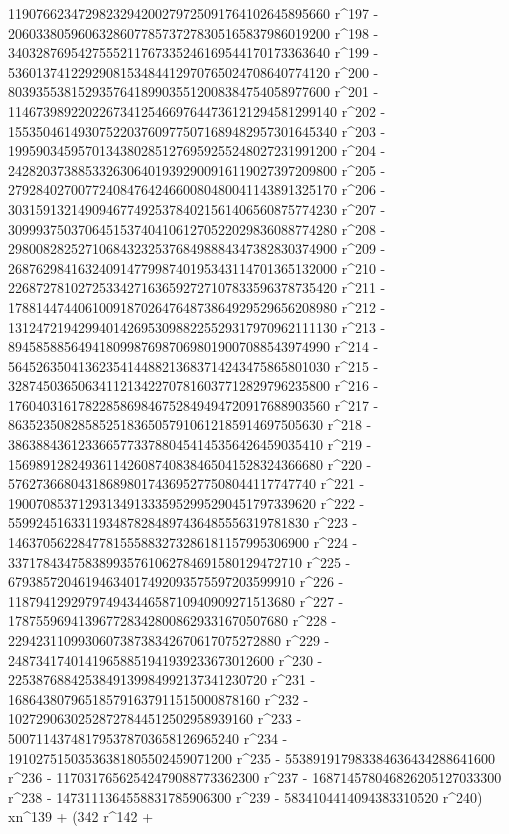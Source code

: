        1190766234729823294200279725091764102645895660 r^197 - 
       2060338059606328607785737278305165837986019200 r^198 - 
       3403287695427555211767335246169544170173363640 r^199 - 
       5360137412292908153484412970765024708640774120 r^200 - 
       8039355381529357641899035512008384754058977600 r^201 - 
       11467398922022673412546697644736121294581299140 r^202 - 
       15535046149307522037609775071689482957301645340 r^203 - 
       19959034595701343802851276959255248027231991200 r^204 - 
       24282037388533263064019392900916119027397209800 r^205 - 
       27928402700772408476424660080480041143891325170 r^206 - 
       30315913214909467749253784021561406560875774230 r^207 - 
       30999375037064515374041061270522029836088774280 r^208 - 
       29800828252710684323253768498884347382830374900 r^209 - 
       26876298416324091477998740195343114701365132000 r^210 - 
       22687278102725334271636592727107833596378735420 r^211 - 
       17881447440610091870264764873864929529656208980 r^212 - 
       13124721942994014269530988225529317970962111130 r^213 - 
       8945858856494180998769870698019007088543974990 r^214 - 
       5645263504136235414488213683714243475865801030 r^215 - 
       3287450365063411213422707816037712829796235800 r^216 - 
       1760403161782285869846752849494720917688903560 r^217 - 
       863523508285852518365057910612185914697505630 r^218 - 
       386388436123366577337880454145356426459035410 r^219 - 
       156989128249361142608740838465041528324366680 r^220 - 
       57627366804318689801743695277508044117747740 r^221 - 
       19007085371293134913335952995290451797339620 r^222 - 
       5599245163311934878284897436485556319781830 r^223 - 
       1463705622847781555883273286181157995306900 r^224 - 
       337178434758389935761062784691580129472710 r^225 - 
       67938572046194634017492093575597203599910 r^226 - 
       11879412929797494344658710940909271513680 r^227 - 
       1787559694139677283428008629331670507680 r^228 - 
       229423110993060738738342670617075272880 r^229 - 
       24873417401419658851941939233673012600 r^230 - 
       2253876884253849139984992137341230720 r^231 - 
       168643807965185791637911515000878160 r^232 - 
       10272906302528727844512502958939160 r^233 - 
       500711437481795378703658126965240 r^234 - 
       19102751503536381805502459071200 r^235 - 
       553891917983384636434288641600 r^236 - 
       11703176562542479088773362300 r^237 - 
       168714578046826205127033300 r^238 - 
       1473111364558831785906300 r^239 - 
       5834104414094383310520 r^240) xn^139 + (342 r^142 + 
